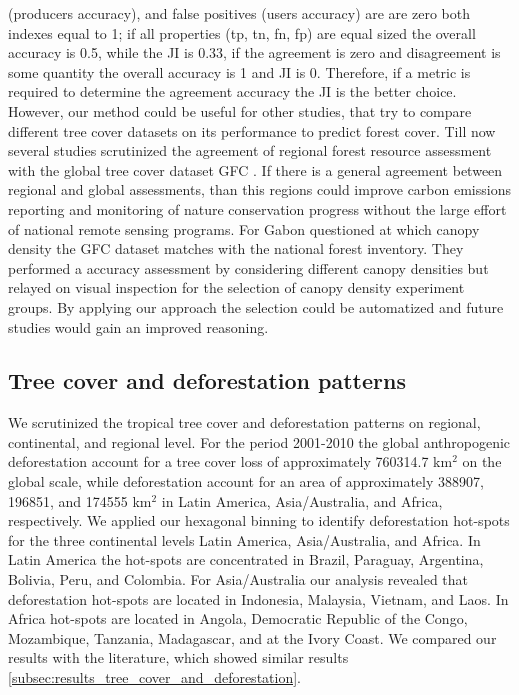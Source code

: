 (producers accuracy), and false positives (users accuracy) are are zero both indexes equal to 1; if all properties (tp, tn, fn, fp) are equal sized the overall accuracy is 0.5, while the \ac{JI} is 0.33, if the agreement is zero and disagreement is some quantity the overall accuracy is 1 and \ac{JI} is 0. Therefore, if a metric is required to determine the agreement accuracy the \ac{JI} is the better choice. However, our method could be useful for other studies, that try to compare different tree cover datasets on its performance to predict forest cover. Till now several studies scrutinized the agreement of regional forest resource assessment with the global tree cover dataset \ac{GFC} \citep{Sannier2016,McRoberts2016,Gross2017}. If there is a general agreement between regional and global assessments, than this regions could improve carbon emissions reporting and monitoring of nature conservation progress without the large effort of national remote sensing programs. For Gabon \citeauthor{Sannier2016} questioned at which canopy density the \ac{GFC} dataset matches with the national forest inventory. They performed a accuracy assessment by considering different canopy densities but relayed on visual inspection for the selection of canopy density experiment groups. By applying our approach the selection could be automatized and future studies would gain an improved reasoning.

		\subsection{Tree cover and deforestation patterns}
		\label{subsec:discussion_tree_cover_and_deforestation}
			We scrutinized the tropical tree cover and deforestation patterns on regional, continental, and regional level. For the period 2001-2010 the global anthropogenic deforestation account for a tree cover loss of approximately 760314.7 km$^2$ on the global scale, while deforestation account for an area of approximately 388907, 196851, and 174555 km$^2$ in Latin America, Asia/Australia, and Africa, respectively. We applied our hexagonal binning to identify deforestation hot-spots for the three continental levels Latin America, Asia/Australia, and Africa. In Latin America the hot-spots are concentrated in Brazil, Paraguay, Argentina, Bolivia, Peru, and Colombia. For Asia/Australia our analysis revealed that deforestation hot-spots are located in Indonesia, Malaysia, Vietnam, and Laos. In Africa hot-spots are located in Angola, Democratic Republic of the Congo, Mozambique, Tanzania, Madagascar, and at the Ivory Coast. We compared our results with the literature, which showed similar results \ref{subsec:results_tree_cover_and_deforestation}.

